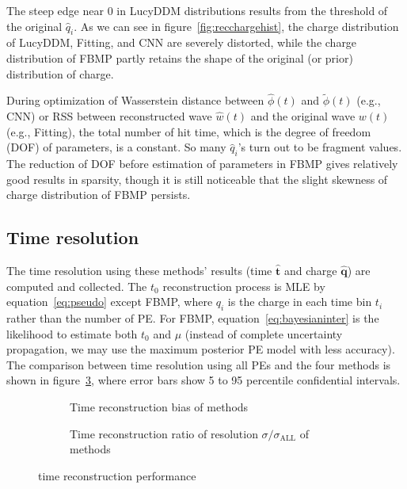 The steep edge near 0 in LucyDDM distributions results from the threshold of the original $\hat{q}_i$. As we can see in figure~\ref{fig:recchargehist}, the charge distribution of LucyDDM, Fitting, and CNN are severely distorted, while the charge distribution of FBMP partly retains the shape of the original (or prior) distribution of charge. 

During optimization of Wasserstein distance between $\hat{\phi}(t)$ and $\tilde{\phi}(t)$ (e.g., CNN) or RSS between reconstructed wave $\hat{w}(t)$ and the original wave $w(t)$ (e.g., Fitting), the total number of hit time, which is the degree of freedom (DOF) of parameters, is a constant. So many $\hat{q}_i$'s turn out to be fragment values. The reduction of DOF before estimation of parameters in FBMP gives relatively good results in sparsity, though it is still noticeable that the slight skewness of charge distribution of FBMP persists. 

\subsection{Time resolution}
\label{subsec:timeresolution}


The time resolution using these methods' results (time $\bm{\hat{t}}$ and charge $\bm{\hat{q}}$) are computed and collected. The $t_{0}$ reconstruction process is MLE by equation~\eqref{eq:pseudo} except FBMP, where $q_{i}$ is the charge in each time bin $t_{i}$ rather than the number of PE. For FBMP, equation~\eqref{eq:bayesianinter} is the likelihood to estimate both $t_{0}$ and $\mu$ (instead of complete uncertainty propagation, we may use the maximum posterior PE model with less accuracy). The comparison between time resolution using all PEs and the four methods is shown in figure~\ref{fig:deltamethods}, where error bars show 5 to 95 percentile confidential intervals. 

\begin{figure}[H]
  \begin{subfigure}[b]{\textwidth}
    \centering
    \resizebox{\textwidth}{!}{}
    \caption{\label{fig:biasmethods} Time reconstruction bias of methods}
  \end{subfigure}
  \begin{subfigure}[b]{\textwidth}
    \centering
    \resizebox{\textwidth}{!}{}
    \caption{\label{fig:deltamethods} Time reconstruction ratio of resolution $\sigma/\sigma_{\mathrm{ALL}}$ of methods}
  \end{subfigure}
  \caption{time reconstruction performance}
\end{figure}

